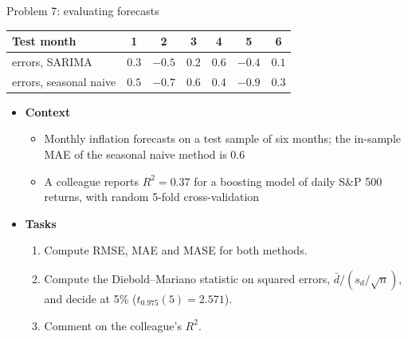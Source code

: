 \begin{frame}{Problem 7: evaluating forecasts}
\itemsize{\footnotesize}
\begin{center}
\scriptsize
\begin{tabular}{lcccccc}
\toprule
\textbf{Test month} & 1 & 2 & 3 & 4 & 5 & 6 \\
\midrule
errors, SARIMA & $0.3$ & $-0.5$ & $0.2$ & $0.6$ & $-0.4$ & $0.1$ \\
errors, seasonal naive & $0.5$ & $-0.7$ & $0.6$ & $0.4$ & $-0.9$ & $0.3$ \\
\bottomrule
\end{tabular}
\end{center}
\begin{itemize}
    \item \textbf{Context}
    \begin{itemize}
        \item Monthly inflation forecasts on a test sample of six months; the in-sample MAE of the seasonal naive method is 0.6
        \item A colleague reports $R^2 = 0.37$ for a boosting model of daily S\&P 500 returns, with random 5-fold cross-validation
    \end{itemize}
    \item \textbf{Tasks}
\begin{enumerate}
    \item Compute RMSE, MAE and MASE for both methods.
    \item Compute the Diebold--Mariano statistic on squared errors, $\bar d/(s_d/\sqrt{n})$, and decide at 5\% ($t_{0.975}(5) = 2.571$).
    \item Comment on the colleague's $R^2$.
\end{enumerate}
\end{itemize}
\end{frame}

